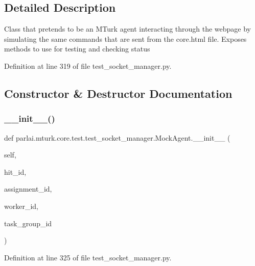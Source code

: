 \subsection{Detailed Description}
\begin{DoxyVerb}Class that pretends to be an MTurk agent interacting through the
webpage by simulating the same commands that are sent from the core.html
file. Exposes methods to use for testing and checking status
\end{DoxyVerb}
 

Definition at line 319 of file test\+\_\+socket\+\_\+manager.\+py.



\subsection{Constructor \& Destructor Documentation}
\mbox{\label{classparlai_1_1mturk_1_1core_1_1test_1_1test__socket__manager_1_1MockAgent_a9709b22bd2fbafc96e35b6c4dad827f8}} 
\subsubsection{\texorpdfstring{\+\_\+\+\_\+init\+\_\+\+\_\+()}{\_\_init\_\_()}}
{\footnotesize\ttfamily def parlai.\+mturk.\+core.\+test.\+test\+\_\+socket\+\_\+manager.\+Mock\+Agent.\+\_\+\+\_\+init\+\_\+\+\_\+ (\begin{DoxyParamCaption}\item[{}]{self,  }\item[{}]{hit\+\_\+id,  }\item[{}]{assignment\+\_\+id,  }\item[{}]{worker\+\_\+id,  }\item[{}]{task\+\_\+group\+\_\+id }\end{DoxyParamCaption})}



Definition at line 325 of file test\+\_\+socket\+\_\+manager.\+py.



